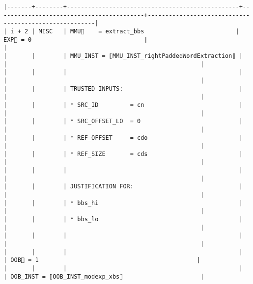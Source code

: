 \documentclass[varwidth=\maxdimen,margin=0.5cm,multi={verbatim}]{standalone}
\begin{document}
\begin{verbatim}
|-------+--------+-------------------------------------------------+------------------------------------------+-------------------------------------------------------|
| i + 2 | MISC   | MMU🏴    = extract_bbs                          | EXP🏴 = 0                                |                                                       |
|       |        | MMU_INST = ⟦MMU_INST_rightPaddedWordExtraction⟧ |                                          |                                                       |
|       |        |                                                 |                                          |                                                       |
|       |        | TRUSTED INPUTS:                                 |                                          |                                                       |
|       |        | * SRC_ID         = cn                           |                                          |                                                       |
|       |        | * SRC_OFFSET_LO  = 0                            |                                          |                                                       |
|       |        | * REF_OFFSET     = cdo                          |                                          |                                                       |
|       |        | * REF_SIZE       = cds                          |                                          |                                                       |
|       |        |                                                 |                                          |                                                       |
|       |        | JUSTIFICATION FOR:                              |                                          |                                                       |
|       |        | * bbs_hi                                        |                                          |                                                       |
|       |        | * bbs_lo                                        |                                          |                                                       |
|       |        |                                                 |                                          |                                                       |
|       |        |                                                 |                                          | OOB🏴 = 1                                             |
|       |        |                                                 |                                          | OOB_INST = ⟦OOB_INST_modexp_xbs⟧                      |

\end{verbatim}
\end{document}
